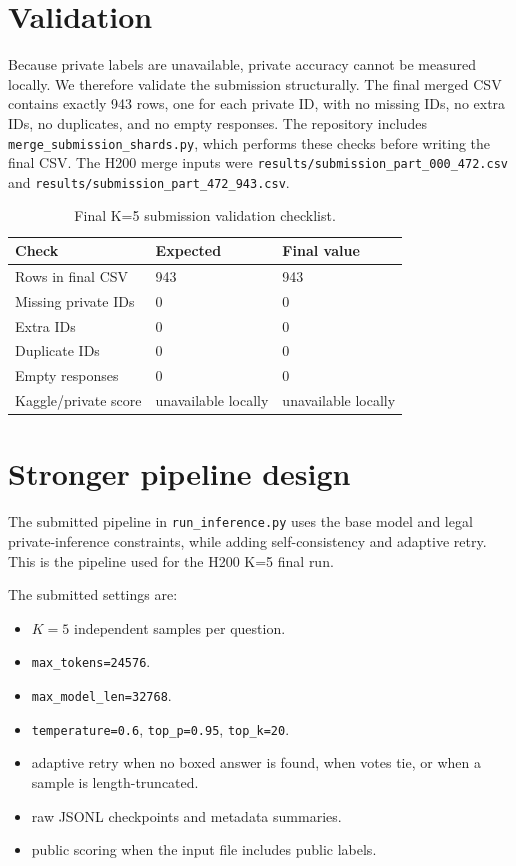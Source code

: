 \documentclass{article}
\begin{document}
\section{Validation}

Because private labels are unavailable, private accuracy cannot be measured locally. We therefore validate the submission structurally. The final merged CSV contains exactly 943 rows, one for each private ID, with no missing IDs, no extra IDs, no duplicates, and no empty responses. The repository includes \texttt{merge\_submission\_shards.py}, which performs these checks before writing the final CSV. The H200 merge inputs were \texttt{results/submission\_part\_000\_472.csv} and \texttt{results/submission\_part\_472\_943.csv}.

\begin{table}[h]
\centering
\caption{Final K=5 submission validation checklist.}
\label{tab:validation}
\begin{tabular}{lll}
\toprule
Check & Expected & Final value \\
\midrule
Rows in final CSV & 943 & 943 \\
Missing private IDs & 0 & 0 \\
Extra IDs & 0 & 0 \\
Duplicate IDs & 0 & 0 \\
Empty responses & 0 & 0 \\
Kaggle/private score & unavailable locally & unavailable locally \\
\bottomrule
\end{tabular}
\end{table}

\section{Stronger pipeline design}

The submitted pipeline in \texttt{run\_inference.py} uses the base model and legal private-inference constraints, while adding self-consistency and adaptive retry. This is the pipeline used for the H200 K=5 final run.

The submitted settings are:

\begin{itemize}
  \item $K=5$ independent samples per question.
  \item \texttt{max\_tokens=24576}.
  \item \texttt{max\_model\_len=32768}.
  \item \texttt{temperature=0.6}, \texttt{top\_p=0.95}, \texttt{top\_k=20}.
  \item adaptive retry when no boxed answer is found, when votes tie, or when a sample is length-truncated.
  \item raw JSONL checkpoints and metadata summaries.
  \item public scoring when the input file includes public labels.
\end{itemize}
\end{document}
